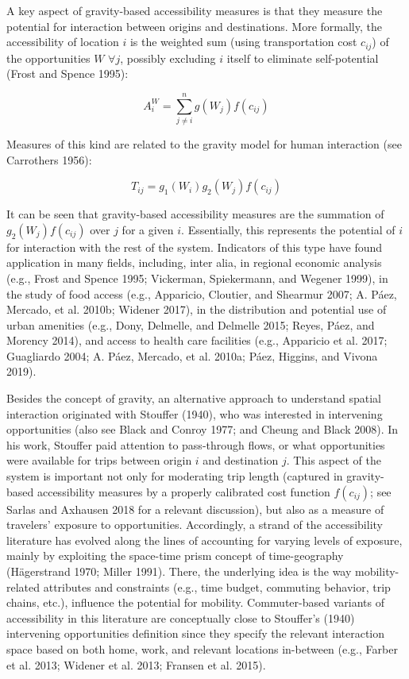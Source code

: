 \documentclass[]{elsarticle} %
\begin{document}
A key aspect of gravity-based accessibility measures is that they
measure the potential for interaction between origins and destinations.
More formally, the accessibility of location \(i\) is the weighted sum
(using transportation cost \(c_{ij}\)) of the opportunities \(W\)
\(\forall j\), possibly excluding \(i\) itself to eliminate
self-potential (Frost and Spence 1995):

\begin{equation}\label{f:access}
A_i^W = \sum_{j\ne i}^n{g(W_j)f(c_{ij})}
\end{equation}

Measures of this kind are related to the gravity model for human
interaction (see Carrothers 1956):

\begin{equation}\label{f:gravity}
T_{ij} = g_1(W_i)g_2(W_j)f(c_{ij})
\end{equation}

It can be seen that gravity-based accessibility measures are the
summation of \(g_2(W_j)f(c_{ij})\) over \(j\) for a given \(i\).
Essentially, this represents the potential of \(i\) for interaction with
the rest of the system. Indicators of this type have found application
in many fields, including, inter alia, in regional economic analysis
(e.g., Frost and Spence 1995; Vickerman, Spiekermann, and Wegener 1999),
in the study of food access (e.g., Apparicio, Cloutier, and Shearmur
2007; A. Páez, Mercado, et al. 2010b; Widener 2017), in the distribution
and potential use of urban amenities (e.g., Dony, Delmelle, and Delmelle
2015; Reyes, Páez, and Morency 2014), and access to health care
facilities (e.g., Apparicio et al. 2017; Guagliardo 2004; A. Páez,
Mercado, et al. 2010a; Páez, Higgins, and Vivona 2019).

Besides the concept of gravity, an alternative approach to understand
spatial interaction originated with Stouffer (1940), who was interested
in intervening opportunities (also see Black and Conroy 1977; and Cheung
and Black 2008). In his work, Stouffer paid attention to pass-through
flows, or what opportunities were available for trips between origin
\(i\) and destination \(j\). This aspect of the system is important not
only for moderating trip length (captured in gravity-based accessibility
measures by a properly calibrated cost function \(f(c_{ij})\); see
Sarlas and Axhausen 2018 for a relevant discussion), but also as a
measure of travelers' exposure to opportunities. Accordingly, a strand
of the accessibility literature has evolved along the lines of
accounting for varying levels of exposure, mainly by exploiting the
space-time prism concept of time-geography (Hägerstrand 1970; Miller
1991). There, the underlying idea is the way mobility-related attributes
and constraints (e.g., time budget, commuting behavior, trip chains,
etc.), influence the potential for mobility. Commuter-based variants of
accessibility in this literature are conceptually close to Stouffer's
(1940) intervening opportunities definition since they specify the
relevant interaction space based on both home, work, and relevant
locations in-between (e.g., Farber et al. 2013; Widener et al. 2013;
Fransen et al. 2015).
\end{document}
